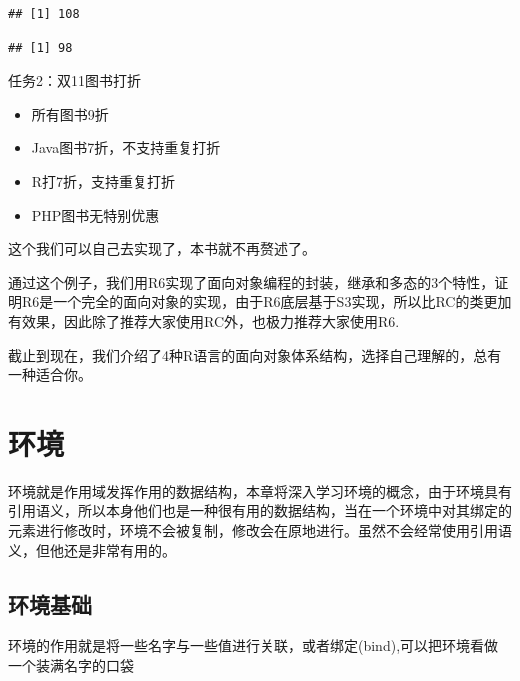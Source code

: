 \documentclass[]{book}
\newenvironment{Shaded}{\begin{snugshade}}{\end{snugshade}}
\newcommand{\KeywordTok}[1]{\textcolor[rgb]{0.13,0.29,0.53}{\textbf{#1}}}
\newcommand{\DecValTok}[1]{\textcolor[rgb]{0.00,0.00,0.81}{#1}}
\newcommand{\StringTok}[1]{\textcolor[rgb]{0.31,0.60,0.02}{#1}}
\newcommand{\OperatorTok}[1]{\textcolor[rgb]{0.81,0.36,0.00}{\textbf{#1}}}
\newcommand{\NormalTok}[1]{#1}
\begin{document}
\begin{verbatim}
## [1] 108
\end{verbatim}

\begin{Shaded}
\end{Shaded}

\begin{verbatim}
## [1] 98
\end{verbatim}

任务2：双11图书打折

\begin{itemize}
\item
  所有图书9折
\item
  Java图书7折，不支持重复打折
\item
  R打7折，支持重复打折
\item
  PHP图书无特别优惠
\end{itemize}

这个我们可以自己去实现了，本书就不再赘述了。

通过这个例子，我们用R6实现了面向对象编程的封装，继承和多态的3个特性，证明R6是一个完全的面向对象的实现，由于R6底层基于S3实现，所以比RC的类更加有效果，因此除了推荐大家使用RC外，也极力推荐大家使用R6.

截止到现在，我们介绍了4种R语言的面向对象体系结构，选择自己理解的，总有一种适合你。

\chapter{环境}\label{env}

环境就是作用域发挥作用的数据结构，本章将深入学习环境的概念，由于环境具有引用语义，所以本身他们也是一种很有用的数据结构，当在一个环境中对其绑定的元素进行修改时，环境不会被复制，修改会在原地进行。虽然不会经常使用引用语义，但他还是非常有用的。

\section{环境基础}

环境的作用就是将一些名字与一些值进行关联，或者绑定(bind),可以把环境看做一个装满名字的口袋
\end{document}
